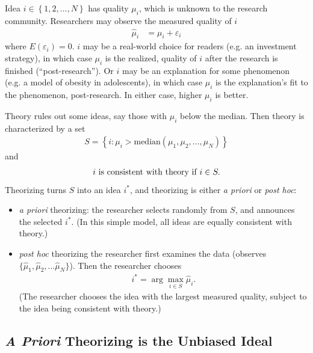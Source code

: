 \documentclass[12pt,english]{article}
\theoremstyle{plain}
\theoremstyle{plain}
\begin{document}
Idea $i \in \left\{ 1,2,...,N\right\} $ has quality $\mu_{i}$, which is unknown to the research community. Researchers may observe the measured quality of $i$ 
\begin{align}
\hat{\mu}_{i} &= \mu_{i} + \varepsilon_{i}
\label{eq:ez:muhat}
\end{align}
where $E\left(\varepsilon_{i}\right) = 0$. $i$ may be a real-world choice for readers (e.g. an investment strategy), in which case $\mu_{i}$ is the realized, quality of $i$ after the research is finished (``post-research''). Or $i$ may be an explanation for some phenomenon (e.g. a model of obesity in adolescents), in which case $\mu_{i}$ is the explanation's fit to the phenomenon, post-research. In either case, higher $\mu_{i}$ is better.

Theory rules out some ideas, say those with $\mu_{i}$ below the median. Then theory is characterized by a set 
\begin{align}
    S = \left\{ i: \mu_{i} > \text{median}\left(\mu_1,\mu_2,...,\mu_N\right)\right\}
    \label{eq:ez:S}
\end{align}
and 
\begin{align}
\text{\ensuremath{i} is consistent with theory if }i\in S .
\end{align}
Theorizing turns $S$ into an idea $i^\ast$, and theorizing is either \emph{a priori} or \emph{post hoc}: 
\begin{itemize}
\item \emph{a priori} theorizing: the researcher selects randomly from $S$, and announces the selected $i^\ast$. (In this simple model, all ideas are equally consistent with theory.)
\item \emph{post hoc} theorizing the researcher first examines the data (observes $\{\hat{\mu}_1,\hat{\mu}_2,...\hat{\mu}_N\}$). Then the researcher chooses 
\begin{align}
    i^\ast =  \arg\max_{i\in S }\hat{\mu}_{i}.\label{eq:given-ihat}
\end{align}
(The researcher chooses the idea with the largest measured quality, subject to the idea being consistent with theory.)
\end{itemize}

\subsection{\emph{A Priori} Theorizing is the Unbiased Ideal}
\end{document}
